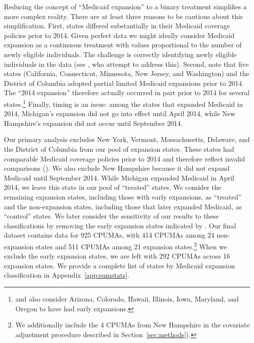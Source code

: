 \documentclass[aoas]{imsart}
\theoremstyle{plain}
\theoremstyle{remark}
\begin{document}
Reducing the concept of ``Medicaid expansion'' to a binary treatment simplifies a more complex reality. There are at least three reasons to be cautious about this simplification. First, states differed substantially in their Medicaid coverage policies prior to 2014. Given perfect data we might ideally consider Medicaid expansion as a continuous treatment with values proportional to the number of newly eligible individuals. The challenge is correctly identifying newly eligible individuals in the data (see \cite{frean2017premium}, who attempt to address this). Second, \cite{frean2017premium} note that five states (California, Connecticut, Minnesota, New Jersey, and Washington) and the District of Columbia adopted partial limited Medicaid expansions prior to 2014. The ``2014 expansion'' therefore actually occurred in part prior to 2014 for several states.\footnote{\cite{kaestner2017effects} and \cite{courtemanche2017early} also consider Arizona, Colorado, Hawaii, Illinois, Iowa, Maryland, and Oregon to have had early expansions.} Finally, timing is an issue: among the states that expanded Medicaid in 2014, Michigan's expansion did not go into effect until April 2014, while New Hampshire's expansion did not occur until September 2014.

Our primary analysis excludes New York, Vermont, Massachusetts, Delaware, and the District of Columbia from our pool of expansion states. These states had comparable Medicaid coverage policies prior to 2014 and therefore reflect invalid comparisons (\cite{kaestner2017effects}). We also exclude New Hampshire because it did not expand Medicaid until September 2014. While Michigan expanded Medicaid in April 2014, we leave this state in our pool of ``treated'' states. We consider the remaining expansion states, including those with early expansions, as ``treated'' and the non-expansion states, including those that later expanded Medicaid, as ``control'' states. We later consider the sensitivity of our results to these classifications by removing the early expansion states indicated by \cite{frean2017premium}. Our final dataset contains data for 925 CPUMAs, with 414 CPUMAs among 24 non-expansion states and 511 CPUMAs among 21 expansion states.\footnote{We additionally include the 4 CPUMAs from New Hampshire in the covariate adjustment procedure described in Section~\ref{sec:methods}).} When we exclude the early expansion states, we are left with 292 CPUMAs across 16 expansion states. We provide a complete list of states by Medicaid expansion classification in Appendix~\ref{app:sumstats}.
\end{document}
